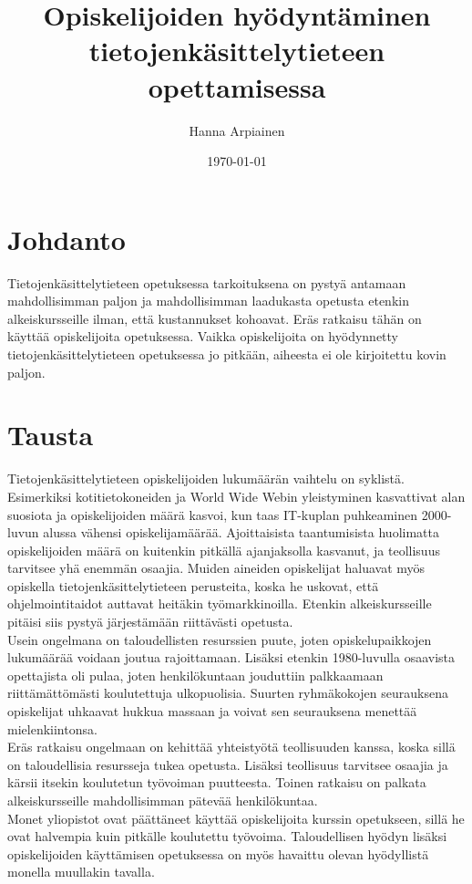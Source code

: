 \documentclass[finnish]{tktltiki2}
\title{﻿Opiskelijoiden hyödyntäminen tietojenkäsittelytieteen opettamisessa}
\author{Hanna Arpiainen}
\date{\today}
\theoremstyle{definition}
\theoremstyle{remark}
\begin{document}
\maketitle
\makeabstract

\tableofcontents
\newpage



\section{Johdanto}
Tietojenkäsittelytieteen opetuksessa tarkoituksena on pystyä antamaan mahdollisimman paljon ja mahdollisimman laadukasta opetusta etenkin alkeiskursseille ilman, että kustannukset kohoavat. Eräs ratkaisu tähän on käyttää opiskelijoita opetuksessa. Vaikka opiskelijoita on hyödynnetty tietojenkäsittelytieteen opetuksessa jo pitkään, aiheesta ei ole kirjoitettu kovin paljon.



\section{Tausta}
Tietojenkäsittelytieteen opiskelijoiden lukumäärän vaihtelu on syklistä.\cite{Roberts11} Esimerkiksi kotitietokoneiden ja World Wide Webin yleistyminen kasvattivat alan suosiota ja opiskelijoiden määrä kasvoi, kun taas IT-kuplan puhkeaminen 2000-luvun alussa vähensi opiskelijamäärää. Ajoittaisista taantumisista huolimatta opiskelijoiden määrä on kuitenkin pitkällä ajanjaksolla kasvanut, ja teollisuus tarvitsee yhä enemmän osaajia. Muiden aineiden opiskelijat haluavat myös opiskella tietojenkäsittelytieteen perusteita, koska he uskovat, että ohjelmointitaidot auttavat heitäkin työmarkkinoilla. Etenkin alkeiskursseille pitäisi siis pystyä järjestämään riittävästi opetusta. 
\\
Usein ongelmana on taloudellisten resurssien puute, joten opiskelupaikkojen lukumäärää voidaan joutua rajoittamaan. Lisäksi etenkin 1980-luvulla osaavista opettajista oli pulaa, joten henkilökuntaan jouduttiin palkkaamaan riittämättömästi koulutettuja ulkopuolisia. \cite{Roberts11} Suurten ryhmäkokojen seurauksena opiskelijat uhkaavat hukkua massaan ja voivat sen seurauksena menettää mielenkiintonsa.\cite{Kay98}
\\
Eräs ratkaisu ongelmaan on kehittää yhteistyötä teollisuuden kanssa, koska sillä on taloudellisia resursseja tukea opetusta. Lisäksi teollisuus tarvitsee osaajia ja kärsii itsekin koulutetun työvoiman puutteesta. Toinen ratkaisu on palkata alkeiskursseille mahdollisimman pätevää henkilökuntaa.\cite{Roberts11}
\\
Monet yliopistot ovat päättäneet käyttää opiskelijoita kurssin opetukseen, sillä he ovat halvempia kuin pitkälle koulutettu työvoima. Taloudellisen hyödyn lisäksi opiskelijoiden käyttämisen opetuksessa on myös havaittu olevan hyödyllistä monella muullakin tavalla.
\end{document}
